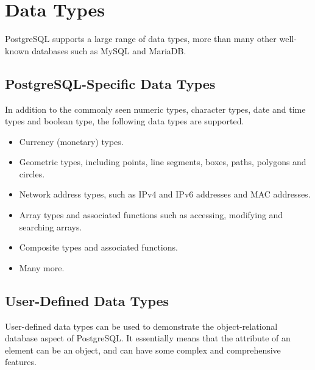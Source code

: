 \section{Data Types}

PostgreSQL supports a large range of data types, more than many other well-known databases such as MySQL and MariaDB. 

\subsection{PostgreSQL-Specific Data Types}

In addition to the commonly seen numeric types, character types, date and time types and boolean type, the following data types are supported.
\begin{itemize}
	\item Currency (monetary) types.
	\item Geometric types, including points, line segments, boxes, paths, polygons and circles.
	\item Network address types, such as IPv4 and IPv6 addresses and MAC addresses.
	\item Array types and associated functions such as accessing, modifying and searching arrays.
	\item Composite types and associated functions.
	\item Many more.
\end{itemize}

\subsection{User-Defined Data Types}

User-defined data types can be used to demonstrate the object-relational database aspect of PostgreSQL. It essentially means that the attribute of an element can be an object, and can have some complex and comprehensive features.

